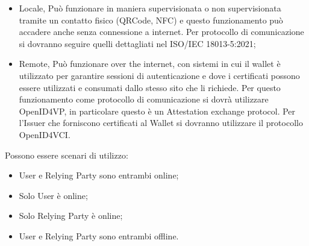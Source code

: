     \begin{itemize}
        \item Locale, Può funzionare in maniera supervisionata o non supervisionata tramite un contatto fisico (QRCode, NFC) e questo funzionamento può accadere anche senza connessione a internet. Per protocollo di comunicazione si dovranno seguire quelli dettagliati nel
        ISO/IEC 18013-5:2021;
        \item Remote, Può funzionare over the internet, con sistemi in cui il wallet è utilizzato per garantire sessioni di autenticazione e dove i certificati possono essere utilizzati e consumati dallo stesso sito che li richiede.
        Per questo funzionamento come protocollo di comunicazione si dovrà utilizzare OpenID4VP, in particolare questo è un Attestation exchange protocol.
        Per l'Issuer che forniscono certificati al Wallet si dovranno utilizzare il protocollo OpenID4VCI.
    \end{itemize}

    Possono essere scenari di utilizzo:
    \begin{itemize}
        \item User e Relying Party sono entrambi online;
        \item Solo User è online;
        \item Solo Relying Party è online;
        \item User e Relying Party sono entrambi offline.
    \end{itemize}